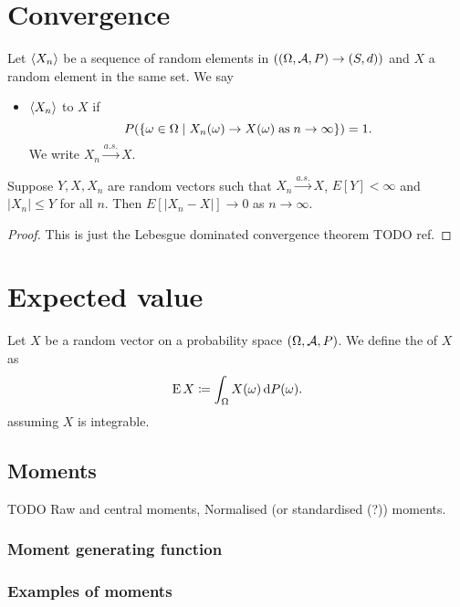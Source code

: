 \section{Convergence}
\begin{definition}
Let $\left\langle X_n \right\rangle$ be a sequence of random elements in $(\sSet{\Omega, \mathcal{A}, P} \to \sSet{S,d})$ and $X$ a random element in the same set. We say
\begin{itemize}
\item $\left\langle X_n \right\rangle$  to $X$ if
\[ P(\setbuilder{\omega\in\Omega}{X_n(\omega) \to X(\omega)\;\text{as}\; n\to \infty}) = 1. \]
We write $X_n \overset{a.s.}{\longrightarrow} X$.
\end{itemize}
\end{definition}

\begin{lemma}
Suppose $Y,X,X_n$ are random vectors such that $X_n \overset{a.s.}{\longrightarrow} X$, $E[Y]<\infty$ and $|X_n| \leq Y$ for all $n$. Then $E[|X_n -X|] \to 0$ as $n\to \infty$.
\end{lemma}
\begin{proof}
This is just the Lebesgue dominated convergence theorem TODO ref.
\end{proof}

\section{Expected value}
\begin{definition}
Let $X$ be a random  vector on a probability space $\sSet{\Omega, \mathcal{A}, P}$. We define the  of $X$ as
\[ \operatorname{E}{X} \coloneqq \int_\Omega X(\omega)\operatorname{d \!}{P(\omega)}. \]
assuming $X$ is integrable.
\end{definition}



\subsection{Moments}
\begin{definition}
TODO Raw and central moments, Normalised (or standardised (?)) moments.
\end{definition}

\subsubsection{Moment generating function}

\subsubsection{Examples of moments}
